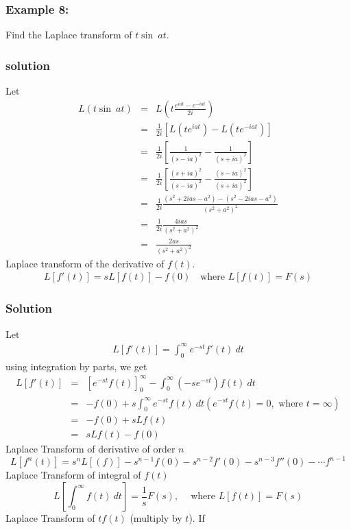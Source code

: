 \documentclass[12pt]{report}
\begin{document}
\subsubsection{Example 8:}
Find the Laplace transform of $t \sin~at$.
\subsubsection{solution}
Let
\begin{eqnarray}
L(t \sin~at)&=&L \left( t \frac{e^{iat}-e^{-iat}}{2i}\right)\nonumber \\
&=& \frac{1}{2i}[L(te^{iat})-L(te^{-iat})]\nonumber \\
&=& \frac{1}{2i}\left[\frac{1}{(s-ia)^2}-\frac{1}{(s+ia)^2}\right]\nonumber \\
&=& \frac{1}{2i}\left[\frac{(s+ia)^2}{(s-ia)^2}-\frac{(s-ia)^2}{(s+ia)^2}\right] \nonumber\\
&=& \frac{1}{2i} \frac{(s^2+2ias-a^2)-(s^2-2ias-a^2)}{(s^2+a^2)^2}\nonumber \\
&=& \frac{1}{2i}\frac{4ias}{(s^2+a^2)^2}\nonumber \\
&=& \frac{2as}{(s^2+a^2)^2}
\end{eqnarray}
Laplace transform of the derivative of $f(t)$.
\begin{align*}
L[f'(t)]=sL[f(t)]-f(0) ~~~\mbox{ where } L[f(t)]=F(s)
\end{align*}
\subsubsection{Solution}
Let
\begin{align*}
L[f'(t)]= \int_0^\infty e^{-st}f'(t)~dt
\end{align*}
using integration by parts, we get
\begin{eqnarray}
L[f'(t)]&=&\left[e^{-st}f(t)\right]_0^\infty-\int_0^\infty (-se^{-st})f(t)~dt\nonumber \\
&=& -f(0)+s \int_0^\infty e^{-st}f(t)~dt (e^{-st}f(t)=0, \mbox{  where } t=\infty)\nonumber \\
&=& -f(0)+sLf(t) \nonumber\\
&=& sLf(t)-f(0)
\end{eqnarray}
Laplace Transform of derivative of order $n$
\begin{equation}
L[f^n(t)]=s^nL[(f)]-s^{n-1}f(0)-s^{n-2}f'(0)-s^{n-3}f''(0)-\cdots f^{n-1}
\end{equation}
Laplace Transform of integral of $f(t)$
\begin{equation}
L \left[\int_0^\infty f(t)~dt\right]=\frac{1}{s}F(s),~~~~\mbox{ where } L[f(t)]=F(s)
\end{equation}
Laplace Transform of $tf(t)$ (multiply by $t$). If
\end{document}
